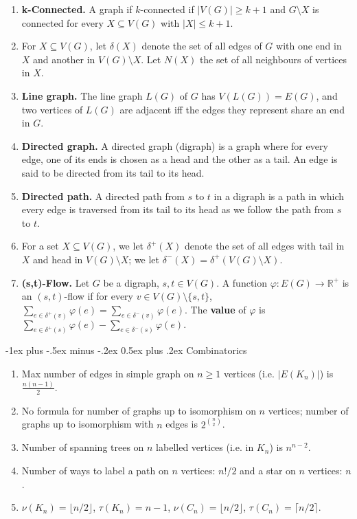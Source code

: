 \documentclass[10pt,landscape]{article}
\makeatletter
\renewcommand{\section}{\@startsection{section}{1}{0mm}%
                                {-1ex plus -.5ex minus -.2ex}%
                                {0.5ex plus .2ex}%
                                {\normalfont\large\bfseries}}
\makeatother
\begin{document}
\begin{multicols}{3}
\begin{enumerate}
	\item \textbf{k-Connected.} A graph if \( k \)-connected if \( |V(G)| \geq k +1  \) and \( G \setminus X \) is connected for every \( X \subseteq V(G) \) with \( |X| \leq k+1. \)
	\item For \( X \subseteq V(G) \), let \( \delta (X) \) denote the set of all edges of \( G \) with one end in \( X \) and another in \( V(G) \setminus X \). Let \( N(X) \) the set of all neighbours of vertices in \( X \).
	\item \textbf{Line graph.} The line graph \( L(G) \) of \( G \) has \( V(L(G)) = E(G) \), and two vertices of \( L(G) \) are adjacent iff the edges they represent share an end in \( G \).
	\item \textbf{Directed graph.} A directed graph (digraph) is a graph where for every edge, one of its ends is chosen as a head and the other as a tail. An edge is said to be directed from its tail to its head.
	\item \textbf{Directed path.} A directed path from \( s \) to \( t \) in a digraph is a path in which every edge is traversed from its tail to its head as we follow the path from \( s \) to \( t \).
	\item For a set \( X \subseteq V(G) \), we let \( \delta ^{+} (X) \) denote the set of all edges with tail in \( X \) and head in \( V(G) \setminus X \); we let \( \delta ^{-} (X) = \delta ^{+} (V(G) \setminus X)  \).
	\item \textbf{(s,t)-Flow.} Let \( G \) be a digraph, \( s , t \in V(G) \). A function \( \varphi : E(G) \to \mathbb{R}^{+}  \) is an \( (s,t) \)-flow if for every \( v \in V(G) \setminus \{ s,t\}  \), \( \sum_{e \in \delta ^{+}(v) }^{}\varphi (e)= \sum_{e \in \delta ^{-} (v)}^{} \varphi (e) \). The \textbf{value} of \( \varphi  \) is \( \sum_{e \in \delta ^{+} (s)}^{}\varphi (e) - \sum_{e \in \delta ^{-} (s)}^{}\varphi (e). \)
\end{enumerate}
\section{Combinatorics}
\begin{enumerate}
	\item Max number of edges in simple graph on \( n \geq 1 \) vertices (i.e. \( |E(K_n)| \)) is \( \frac{n(n-1)}{2}  \).
	\item No formula for number of graphs up to isomorphism on \( n \) vertices; number of graphs up to isomorphism with \( n \) edges is \( 2^{\binom{n}{2} }  \).
	\item Number of spanning trees on \( n \) labelled vertices (i.e. in \( K_n \)) is \( n^{n-2}  \).
	\item Number of ways to label a path on \( n \) vertices: \( n! / 2 \) and a star on \( n \) vertices: \( n \).
	\item \( \nu(K_n) = \lfloor n / 2 \rfloor \), \( \tau (K_n) = n - 1 \), \( \nu (C_n) = \lfloor n / 2 \rfloor \), \( \tau (C_n) = \lceil n / 2 \rceil \).
	

\end{enumerate}
\end{multicols}
\end{document}
